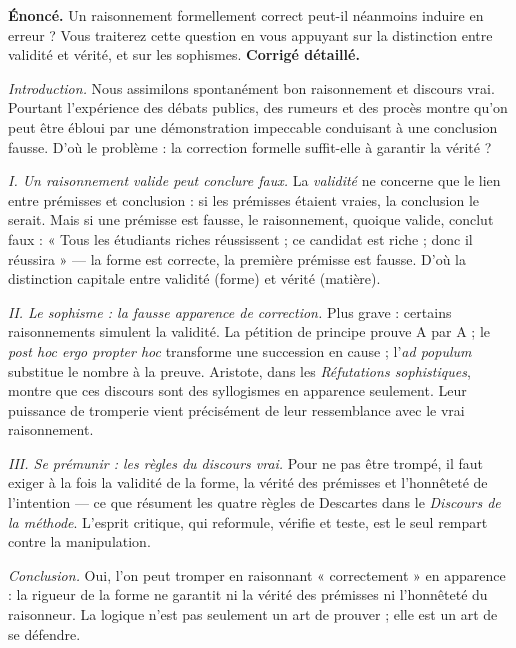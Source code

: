 \documentclass[11pt]{article}
\begin{document}
\begin{exoresolu}
\textbf{Énoncé.} Un raisonnement formellement correct peut-il néanmoins induire en erreur ? Vous traiterez cette question en vous appuyant sur la distinction entre validité et vérité, et sur les sophismes.
\tcblower
\textbf{Corrigé détaillé.}

\emph{Introduction.} Nous assimilons spontanément bon raisonnement et discours vrai. Pourtant l'expérience des débats publics, des rumeurs et des procès montre qu'on peut être ébloui par une démonstration impeccable conduisant à une conclusion fausse. D'où le problème : la correction formelle suffit-elle à garantir la vérité ?

\emph{I. Un raisonnement valide peut conclure faux.} La \emph{validité} ne concerne que le lien entre prémisses et conclusion : si les prémisses étaient vraies, la conclusion le serait. Mais si une prémisse est fausse, le raisonnement, quoique valide, conclut faux : « Tous les étudiants riches réussissent ; ce candidat est riche ; donc il réussira » — la forme est correcte, la première prémisse est fausse. D'où la distinction capitale entre validité (forme) et vérité (matière).

\emph{II. Le sophisme : la fausse apparence de correction.} Plus grave : certains raisonnements simulent la validité. La pétition de principe prouve A par A ; le \emph{post hoc ergo propter hoc} transforme une succession en cause ; l'\emph{ad populum} substitue le nombre à la preuve. Aristote, dans les \emph{Réfutations sophistiques}, montre que ces discours sont des syllogismes en apparence seulement. Leur puissance de tromperie vient précisément de leur ressemblance avec le vrai raisonnement.

\emph{III. Se prémunir : les règles du discours vrai.} Pour ne pas être trompé, il faut exiger à la fois la validité de la forme, la vérité des prémisses et l'honnêteté de l'intention — ce que résument les quatre règles de Descartes dans le \emph{Discours de la méthode}. L'esprit critique, qui reformule, vérifie et teste, est le seul rempart contre la manipulation.

\emph{Conclusion.} Oui, l'on peut tromper en raisonnant « correctement » en apparence : la rigueur de la forme ne garantit ni la vérité des prémisses ni l'honnêteté du raisonneur. La logique n'est pas seulement un art de prouver ; elle est un art de se défendre.
\end{exoresolu}
\end{document}
